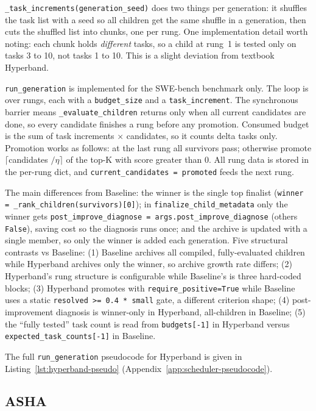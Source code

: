 \texttt{\_task\_increments(generation\_seed)} does two things per
generation: it shuffles the task list with a seed so all children get the
same shuffle in a generation, then cuts the shuffled list into chunks, one
per rung. One implementation detail worth noting: each chunk holds
\emph{different} tasks, so a child at rung~1 is tested only on tasks
3 to 10, not tasks 1 to 10. This is a slight deviation from textbook
Hyperband.

\texttt{run\_generation} is implemented for the SWE-bench benchmark only.
The loop is over rungs, each with a \texttt{budget\_size} and a
\texttt{task\_increment}. The synchronous barrier means
\texttt{\_evaluate\_children} returns only when all current candidates are
done, so every candidate finishes a rung before any promotion. Consumed
budget is the sum of task increments $\times$ candidates, so it counts
delta tasks only. Promotion works as follows: at the last rung all
survivors pass; otherwise promote $\lceil$candidates $/ \eta\rceil$ of the
top-K with score greater than 0. All rung data is stored in the per-rung
dict, and \texttt{current\_candidates = promoted} feeds the next rung.

The main differences from Baseline: the winner is the single top finalist
(\texttt{winner = \_rank\_children(survivors)[0]}); in
\texttt{finalize\_child\_metadata} only the winner gets
\texttt{post\_improve\_diagnose = args.post\_improve\_diagnose} (others
\texttt{False}), saving cost so the diagnosis runs once; and the archive
is updated with a single member, so only the winner is added each
generation. Five structural contrasts vs Baseline: (1) Baseline archives
all compiled, fully-evaluated children while Hyperband archives only the
winner, so archive growth rate differs; (2) Hyperband's rung structure is
configurable while Baseline's is three hard-coded blocks; (3) Hyperband
promotes with \texttt{require\_positive=True} while Baseline uses a static
\texttt{resolved >= 0.4 * small} gate, a different criterion shape; (4)
post-improvement diagnosis is winner-only in Hyperband, all-children in
Baseline; (5) the ``fully tested'' task count is read from
\texttt{budgets[-1]} in Hyperband versus
\texttt{expected\_task\_counts[-1]} in Baseline.

The full \texttt{run\_generation} pseudocode for Hyperband is given in
Listing~\ref{lst:hyperband-pseudo}
(Appendix~\ref{app:scheduler-pseudocode}).

\subsection{ASHA}

